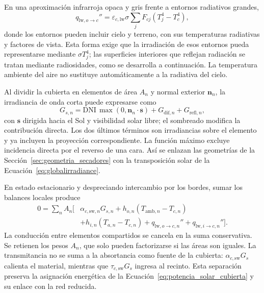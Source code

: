 En una aproximación infrarroja opaca y gris frente a entornos radiativos grandes,
\begin{equation}
q_{\mathrm{lw},o\rightarrow c}''=
\varepsilon_{c,\mathrm{lw}}\sigma
\sum_jF_{cj}(T_j^4-T_c^4),
\label{eq:fund_radiacion_exterior_cubierta}
\end{equation}
donde los entornos pueden incluir cielo y terreno, con sus temperaturas radiativas y factores de vista. Esta forma exige que la irradiación de esos entornos pueda representarse mediante $\sigma T_j^4$; las superficies interiores que reflejan radiación se tratan mediante radiosidades, como se desarrolla a continuación. La temperatura ambiente del aire no sustituye automáticamente a la radiativa del cielo.

Al dividir la cubierta en elementos de área $A_n$ y normal exterior $\mathbf n_n$, la irradiancia de onda corta puede expresarse como
\begin{equation}
G_{s,n}=\mathrm{DNI}\,\max(0,\mathbf n_n\cdot\mathbf s)
+G_{\mathrm{dif},n}+G_{\mathrm{refl},n},
\label{eq:fund_irradiancia_faceta}
\end{equation}
con $\mathbf s$ dirigida hacia el Sol y visibilidad solar libre; el sombreado modifica la contribución directa. Los dos últimos términos son irradiancias sobre el elemento y ya incluyen la proyección correspondiente. La función máximo excluye incidencia directa por el reverso de una cara. Así se enlazan las geometrías de la Sección~\ref{sec:geometria_secadores} con la transposición solar de la Ecuación~\eqref{eq:globalirradiance}.

En estado estacionario y despreciando intercambio por los bordes, sumar los balances locales produce
\begin{equation}
\begin{aligned}
0=\sum_n A_n\bigl[&\alpha_{c,\mathrm{sw},n}G_{s,n}
+h_{o,n}(T_{\mathrm{amb},n}-T_{c,n})\\
&+h_{i,n}(T_{a,n}-T_{c,n})
+q_{\mathrm{lw},o\rightarrow c,n}''+q_{\mathrm{lw},i\rightarrow c,n}''\bigr].
\end{aligned}
\label{eq:fund_balance_cubierta_discreto}
\end{equation}
La conducción entre elementos compartidos se cancela en la suma conservativa. Se retienen los pesos $A_n$, que solo pueden factorizarse si las áreas son iguales. La transmitancia no se suma a la absortancia como fuente de la cubierta: $\alpha_{c,\mathrm{sw}}G_s$ calienta el material, mientras que $\tau_{c,\mathrm{sw}}G_s$ ingresa al recinto. Esta separación preserva la asignación energética de la Ecuación~\eqref{eq:potencia_solar_cubierta} y su enlace con la red reducida.
